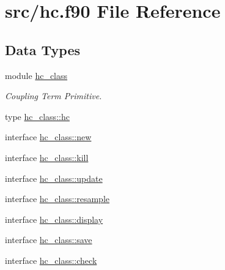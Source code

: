 \hypertarget{hc_8f90}{\section{src/hc.f90 File Reference}
\label{hc_8f90}
}
\subsection*{Data Types}
\begin{DoxyCompactItemize}
\item 
module \hyperlink{classhc__class}{hc\+\_\+class}
\begin{DoxyCompactList}\small\item\em Coupling Term Primitive. \end{DoxyCompactList}\item 
type \hyperlink{structhc__class_1_1hc}{hc\+\_\+class\+::hc}
\item 
interface \hyperlink{interfacehc__class_1_1new}{hc\+\_\+class\+::new}
\item 
interface \hyperlink{interfacehc__class_1_1kill}{hc\+\_\+class\+::kill}
\item 
interface \hyperlink{interfacehc__class_1_1update}{hc\+\_\+class\+::update}
\item 
interface \hyperlink{interfacehc__class_1_1resample}{hc\+\_\+class\+::resample}
\item 
interface \hyperlink{interfacehc__class_1_1display}{hc\+\_\+class\+::display}
\item 
interface \hyperlink{interfacehc__class_1_1save}{hc\+\_\+class\+::save}
\item 
interface \hyperlink{interfacehc__class_1_1check}{hc\+\_\+class\+::check}
\end{DoxyCompactItemize}
